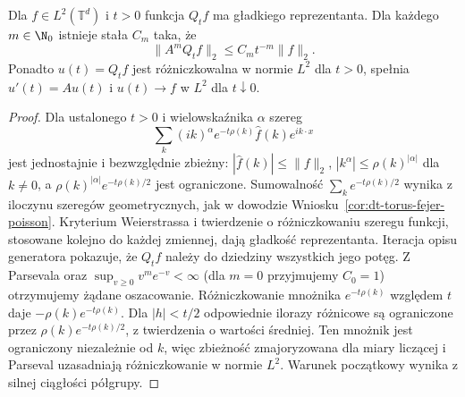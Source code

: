\begin{wniosek}
\label{cor:dt-poisson-smoothing}
Dla $f\in L^2(\mathbb T^d)$ i $t>0$
funkcja $Q_tf$ ma gładkiego reprezentanta.
Dla każdego $m\in\N_0$ istnieje stała $C_m$
taka, że
\[
 \|A^mQ_tf\|_2\le C_m t^{-m}\|f\|_2.
\]
Ponadto $u(t)=Q_tf$ jest różniczkowalna w normie
$L^2$ dla $t>0$, spełnia $u'(t)=Au(t)$
i $u(t)\to f$ w $L^2$ dla $t\downarrow0$.
\end{wniosek}
\begin{proof}
Dla ustalonego $t>0$ i wielowskaźnika $\alpha$
szereg
\[
 \sum_k(ik)^\alpha e^{-t\rho(k)}\widehat f(k)e^{ik\cdot x}
\]
jest jednostajnie i bezwzględnie zbieżny:
$|\widehat f(k)|\le\|f\|_2$,
$|k^\alpha|\le\rho(k)^{|\alpha|}$ dla $k\ne0$,
a $\rho(k)^{|\alpha|}e^{-t\rho(k)/2}$ jest ograniczone.
Sumowalność $\sum_k e^{-t\rho(k)/2}$ wynika
z iloczynu szeregów geometrycznych, jak w dowodzie
Wniosku~\ref{cor:dt-torus-fejer-poisson}.
Kryterium Weierstrassa i twierdzenie o różniczkowaniu
szeregu funkcji, stosowane kolejno do każdej zmiennej,
dają gładkość reprezentanta.
Iteracja opisu generatora pokazuje, że $Q_tf$
należy do dziedziny wszystkich jego potęg.
Z Parsevala oraz
$\sup_{v\ge0}v^me^{-v}<\infty$
(dla $m=0$ przyjmujemy $C_0=1$)
otrzymujemy żądane oszacowanie.
Różniczkowanie mnożnika $e^{-t\rho(k)}$
względem $t$ daje $-\rho(k)e^{-t\rho(k)}$.
Dla $|h|<t/2$ odpowiednie ilorazy różnicowe
są ograniczone przez $\rho(k)e^{-t\rho(k)/2}$,
z twierdzenia o wartości średniej.
Ten mnożnik jest ograniczony niezależnie od $k$,
więc zbieżność zmajoryzowana dla miary liczącej
i Parseval uzasadniają różniczkowanie w normie $L^2$.
Warunek początkowy wynika z silnej ciągłości półgrupy.
\end{proof}

